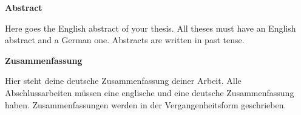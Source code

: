 \begin{titlepage}
\begin{minipage}{\textwidth}
\begin{center}
    \textbf{Abstract}
\end{center}

\noindent
Here goes the English abstract of your thesis. All theses must have an English abstract and a German one. Abstracts are written in past tense.

\vspace{1.5cm}

\begin{center}
    \textbf{Zusammenfassung}
\end{center}

\noindent
Hier steht deine deutsche Zusammenfassung deiner Arbeit. Alle Abschlussarbeiten müssen eine englische und eine deutsche Zusammenfassung haben. Zusammenfassungen werden in der Vergangenheitsform geschrieben.
\end{minipage}


\vfill %

\end{titlepage}
